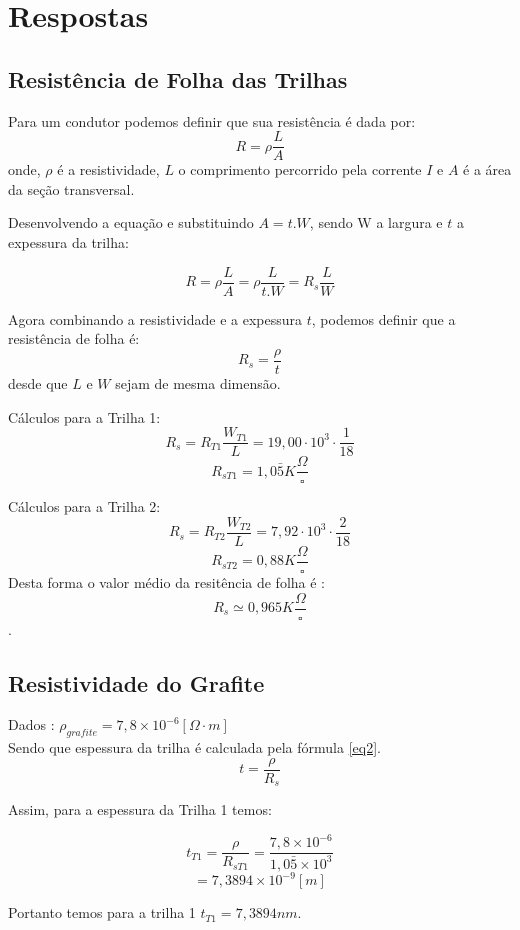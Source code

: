 \section{Respostas}
\subsection{Resistência de Folha das Trilhas}
Para um condutor podemos definir que sua resistência é dada por:
\begin{equation}\label{eq1}
  R = \rho\frac{L}{A}
\end{equation}
onde, $\rho$ é a resistividade, $L$ o comprimento percorrido pela corrente $I$ e $A$ é a área da seção transversal.

Desenvolvendo a equação e substituindo  $A = t.W$, sendo W a largura  e $t$ a expessura da trilha:

$$ R = \rho\frac{L}{A} = \rho\frac{L}{t.W} = R_s\frac{L}{W}  $$

Agora combinando a resistividade e a expessura $t$, podemos definir que a resistência de folha é: 
\begin{equation}\label{eq2}
  R_s = \frac{\rho}{t}  
\end{equation}
desde que $L$ e $W$ sejam de mesma dimensão.


Cálculos para a Trilha 1:
$$ R_s = R_{T1}\frac{W_{T1}}{L} = 19,00\cdot10^3\cdot\frac{1}{18} $$
$$R_{sT1} = 1,0 \bar{5}K{\frac{\Omega}{\square}} $$

Cálculos para a Trilha 2:
$$ R_s = R_{T2}\frac{W_{T2}}{L} = 7,92\cdot10^3\cdot\frac{2}{18} $$
$$R_{sT2} = 0,88K{\frac{\Omega}{\square}} $$
Desta forma o valor médio da resitência de folha é :
$$R_s \simeq0,965K{\frac{\Omega}{\square}}$$.

\subsection{Resistividade do Grafite}

Dados : $\rho_{grafite} = 7,8\times10^{-6}[\Omega\cdot m]$\\ 
Sendo que espessura da trilha é calculada pela fórmula \ref{eq2}.
$$ t = \frac{\rho}{R_s}  $$

Assim, para a espessura da Trilha 1 temos:

$$t_{T1} = \frac{\rho}{R_{sT1}}=\frac{7,8\times10^{-6}}{1,0\bar{5}\times10^3}  $$
$$=7,3894\times10^{-9}[m]$$


Portanto temos para a trilha 1 \quad $t_{T1}=7,3894nm$.

